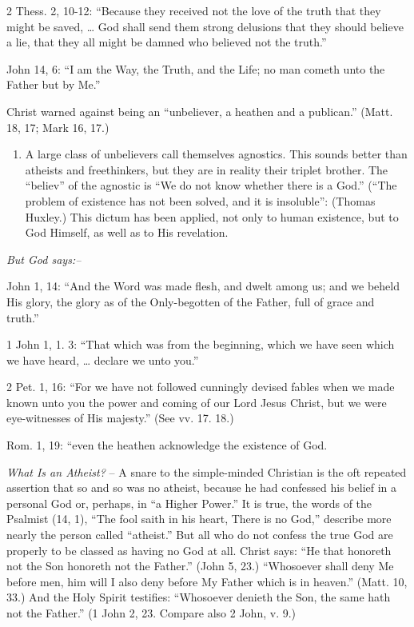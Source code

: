 \documentclass[
]{book}
\providecommand{\tightlist}{%
  \setlength{\itemsep}{0pt}\setlength{\parskip}{0pt}}
\begin{document}
2 Thess. 2, 10-12: ``Because they received not the love of the truth that they might be saved, \ldots{} God shall send them strong delusions that they should believe a lie, that they all might be damned who believed not the truth.''

John 14, 6: ``I am the Way, the Truth, and the Life; no man cometh unto the Father but by Me.''

Christ warned against being an ``unbeliever, a heathen and a publican.'' (Matt. 18, 17; Mark 16, 17.)

\begin{enumerate}
\def\labelenumi{\arabic{enumi}.}
\setcounter{enumi}{1}
\tightlist
\item
  A large class of unbelievers call themselves agnostics. This sounds better than atheists and freethinkers, but they are in reality their triplet brother. The ``believ'' of the agnostic is ``We do not know whether there is a God.'' (``The problem of existence has not been solved, and it is insoluble'': (Thomas Huxley.) This dictum has been applied, not only to human existence, but to God Himself, as well as to His revelation.
\end{enumerate}

\begin{center}
\textsl{But God says:--}
\end{center}

John 1, 14: ``And the Word was made flesh, and dwelt among us; and we beheld His glory, the glory as of the Only-begotten of the Father, full of grace and truth.''

1 John 1, 1. 3: ``That which was from the beginning, which we have seen which we have heard, \ldots{} declare we unto you.''

2 Pet. 1, 16: ``For we have not followed cunningly devised fables when we made known unto you the power and coming of our Lord Jesus Christ, but we were eye-witnesses of His majesty.'' (See vv. 17. 18.)

Rom. 1, 19: ``even the heathen acknowledge the existence of God.

\emph{What Is an Atheist?} -- A snare to the simple-minded Christian is the oft repeated assertion that so and so was no atheist, because he had confessed his belief in a personal God or, perhaps, in ``a Higher Power.'' It is true, the words of the Psalmist (14, 1), ``The fool saith in his heart, There is no God,'' describe more nearly the person called ``atheist.'' But all who do not confess the true God are properly to be classed as having no God at all. Christ says: ``He that honoreth not the Son honoreth not the Father.'' (John 5, 23.) ``Whosoever shall deny Me before men, him will I also deny before My Father which is in heaven.'' (Matt. 10, 33.) And the Holy Spirit testifies: ``Whosoever denieth the Son, the same hath not the Father.'' (1 John 2, 23. Compare also 2 John, v. 9.)
\end{document}
